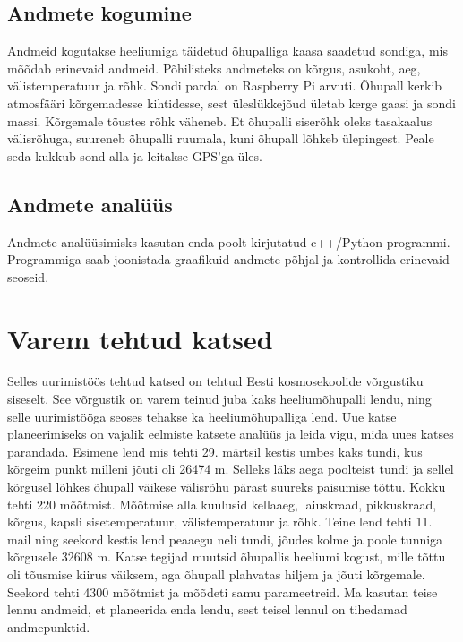 \documentclass{trkut}%
\begin{document}
\subsection{Andmete kogumine}
Andmeid kogutakse heeliumiga täidetud õhupalliga kaasa saadetud sondiga, mis mõõdab erinevaid andmeid. Põhilisteks andmeteks on kõrgus, asukoht, aeg, välistemperatuur ja rõhk. Sondi pardal on Raspberry Pi arvuti. Õhupall kerkib atmosfääri kõrgemadesse kihtidesse, sest üleslükkejõud ületab kerge gaasi ja sondi massi. Kõrgemale tõustes rõhk väheneb. Et õhupalli siserõhk oleks tasakaalus välisrõhuga, suureneb õhupalli ruumala, kuni õhupall lõhkeb ülepingest. Peale seda kukkub sond alla ja leitakse GPS'ga üles.
\subsection{Andmete analüüs}
Andmete analüüsimisks kasutan enda poolt kirjutatud c++/Python programmi. Programmiga saab joonistada graafikuid andmete põhjal ja kontrollida erinevaid seoseid.

\section{Varem tehtud katsed}
Selles uurimistöös tehtud katsed on tehtud Eesti kosmosekoolide võrgustiku siseselt. See võrgustik on varem teinud juba kaks heeliumõhupalli lendu, ning selle uurimistööga seoses tehakse ka heeliumõhupalliga lend. Uue katse planeerimiseks on vajalik eelmiste katsete analüüs ja leida vigu, mida uues katses parandada.
\newline Esimene lend mis tehti 29. märtsil kestis umbes kaks tundi, kus kõrgeim punkt milleni jõuti oli 26474 m. Selleks läks aega poolteist tundi ja sellel kõrgusel lõhkes õhupall väikese välisrõhu pärast suureks paisumise tõttu. Kokku tehti 220 mõõtmist. Mõõtmise alla kuulusid kellaaeg, laiuskraad, pikkuskraad, kõrgus, kapsli sisetemperatuur, välistemperatuur ja rõhk.
\newline Teine lend tehti 11. mail ning seekord kestis lend peaaegu neli tundi, jõudes kolme ja poole tunniga kõrgusele 32608 m. Katse tegijad muutsid õhupallis heeliumi kogust, mille tõttu oli tõusmise kiirus väiksem, aga õhupall plahvatas hiljem ja jõuti kõrgemale. Seekord tehti 4300 mõõtmist ja mõõdeti samu parameetreid.
\newline Ma kasutan teise lennu andmeid, et planeerida enda lendu, sest teisel lennul on tihedamad andmepunktid.
\end{document}
